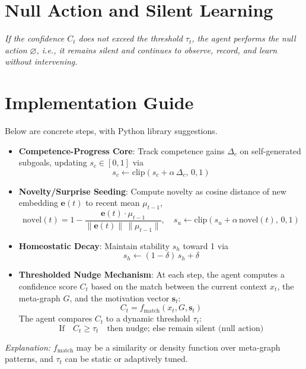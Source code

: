 \documentclass[11pt]{article}
\begin{document}
\section{Null Action and Silent Learning}
\textit{If the confidence $C_t$ does not exceed the threshold $\tau_t$, the agent performs the null action $\varnothing$, i.e., it remains silent and continues to observe, record, and learn without intervening.}

\section{Implementation Guide}

Below are concrete steps, with Python library suggestions.

\begin{itemize}
  \item \textbf{Competence-Progress Core}: Track competence gains $\Delta_c$ on self-generated subgoals, updating $s_c\in[0,1]$ via
  \[
    s_c \leftarrow \mathrm{clip}(s_c + \alpha\,\Delta_c,\,0,1)
  \]
  \item \textbf{Novelty/Surprise Seeding}: Compute novelty as cosine distance of new embedding $\mathbf{e}(t)$ to recent mean $\mu_{t-1}$,
  \[
    \mathrm{novel}(t) = 1 - \frac{\mathbf{e}(t)\cdot\mu_{t-1}}{\|\mathbf{e}(t)\|\,\|\mu_{t-1}\|},\quad
    s_u \leftarrow \mathrm{clip}(s_u + \alpha\,\mathrm{novel}(t),\,0,1)
  \]
  \item \textbf{Homeostatic Decay}: Maintain stability $s_h$ toward 1 via
  \[
    s_h \leftarrow (1-\delta)\,s_h + \delta
  \]
  \item \textbf{Thresholded Nudge Mechanism}: At each step, the agent computes a confidence score $C_t$ based on the match between the current context $x_t$, the meta-graph $G$, and the motivation vector $\mathbf{s}_t$:
  \[
    C_t = f_\mathrm{match}(x_t, G, \mathbf{s}_t)
  \]
  The agent compares $C_t$ to a dynamic threshold $\tau_t$:
  \[
    \text{If}\quad C_t \geq \tau_t\quad \text{then nudge; else remain silent (null action)}
  \]
\end{itemize}
  \textit{Explanation:} $f_\mathrm{match}$ may be a similarity or density function over meta-graph patterns, and $\tau_t$ can be static or adaptively tuned.
\end{document}
